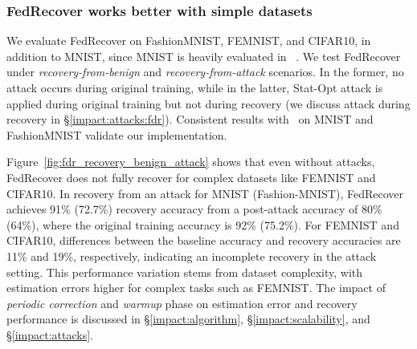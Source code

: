 \subsubsection{FedRecover works better with simple datasets}\label{impact:datasets:fdr}
We evaluate FedRecover on FashionMNIST, FEMNIST, and CIFAR10, in addition to MNIST, since  MNIST is heavily evaluated in ~\cite{cao2022fedrecover}. We test FedRecover under \emph{recovery-from-benign} and \emph{recovery-from-attack} scenarios. In the former, no attack occurs during original training, while in the latter, Stat-Opt attack is applied during original training but not during recovery (we discuss attack during recovery in \S\ref{impact:attacks:fdr}). Consistent results with~\cite{cao2022fedrecover} on MNIST and FashionMNIST validate our implementation.

Figure~\ref{fig:fdr_recovery_benign_attack} shows that even without attacks, FedRecover does not fully recover for complex datasets like FEMNIST and CIFAR10. In recovery from an attack for MNIST (Fashion-MNIST), FedRecover achieves 91\% (72.7\%) recovery accuracy from a post-attack accuracy of 80\% (64\%), where the original training accuracy is 92\% (75.2\%). For FEMNIST and CIFAR10, differences between the baseline accuracy and recovery accuracies are 11\% and 19\%, respectively, indicating an incomplete recovery in the attack setting. This performance variation stems from dataset complexity, with estimation errors higher for complex tasks such as FEMNIST. The impact of \emph{periodic correction} and \emph{warmup} phase on estimation error and recovery performance is discussed in \S\ref{impact:algorithm}, \S\ref{impact:scalability}, and \S\ref{impact:attacks}.

